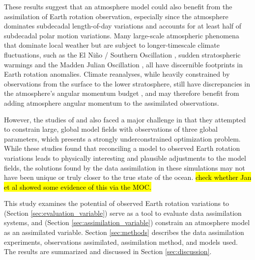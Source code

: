 These results suggest that an atmosphere model could also benefit from the assimilation of Earth rotation observation, especially since the atmosphere dominates subdecadal length-of-day variations and accounts for at least half of subdecadal polar motion variations. 
Many large-scale atmospheric phenomena that dominate local weather but are subject to longer-timescale climate fluctuations, such as 
the El Ni\~no / Southern Oscillation \citep{Chao1984},
sudden stratospheric warmings \citep{Neef2014} and the Madden Julian Oscillation \citep{Weickmann1992}, all have discernible footprints in Earth rotation anomalies. 
Climate reanalyses, while heavily constrained by observations from the surface to the lower stratosphere, still have discrepancies in the atmosphere's angular momentum budget \citep{Berrisford2011,Lehmann2012}, and  may therefore benefit from adding atmosphere angular momentum to the assimilated observations. 

However, the studies of \citet{Saynisch2010,Saynisch2011} and \citet{Saynisch2012} also faced a major challenge in that they attempted to constrain large, global model fields with observations of three global parameters, which presents a strongly underconstrained optimization problem. 
While these studies found that reconciling a model to observed Earth rotation variations leads to physically interesting and plausible adjustments to the model fields, the solutions found by the data assimilation in these simulations may not have been unique or truly closer to the true state of the ocean.  
\hl{check whether Jan et al showed some evidence of this via the MOC.}

This study examines the potential of observed Earth rotation variations to (Section \ref{sec:evaluation_variable}) serve as a tool to evaluate data assimilation systems, and (Section \ref{sec:assimilation_variable}) constrain an atmosphere model as an assimilated variable.
Section \ref{sec:methods} describes the data assimilation experiments, observations assimilated, assimilation method, and models used.
The results are summarized and discussed in Section \ref{sec:discussion}.
